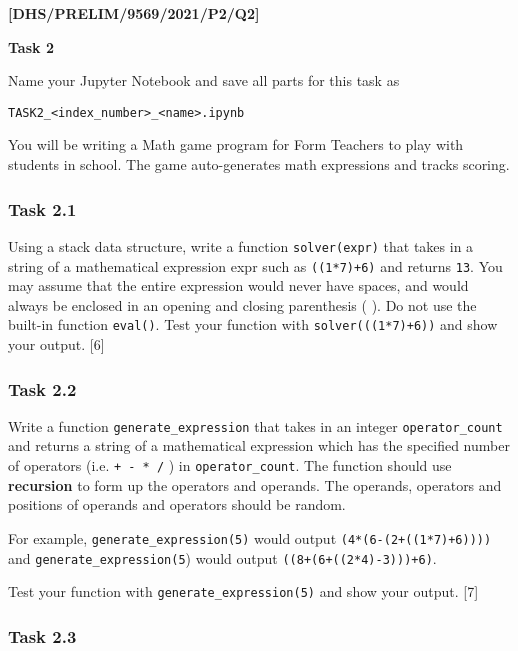 \item \textbf{{[}DHS/PRELIM/9569/2021/P2/Q2{]} }

\textbf{Task 2} 

Name your Jupyter Notebook and save all parts for this task as 

\texttt{TASK2\_<index\_number>\_<name>.ipynb }

You will be writing a Math game program for Form Teachers to play
with students in school. The game auto-generates math expressions
and tracks scoring. 

\subsubsection*{Task 2.1 }

Using a stack data structure, write a function \texttt{solver(expr)}
that takes in a string of a mathematical expression expr such as \texttt{\textquotedbl ((1{*}7)+6)\textquotedbl}
and returns \texttt{13}. You may assume that the entire expression
would never have spaces, and would always be enclosed in an opening
and closing parenthesis \textquotedbl ( )\textquotedbl . Do not
use the built-in function \texttt{eval()}. Test your function with
\texttt{solver(\textquotedbl ((1{*}7)+6)\textquotedbl )} and show
your output. \hfill{}{[}6{]}

\subsubsection*{Task 2.2 }

Write a function \texttt{generate\_expression} that takes in an integer
\texttt{operator\_count} and returns a string of a mathematical expression
which has the specified number of operators (i.e. \texttt{+ - {*}
/} ) in \texttt{operator\_count}. The function should use \textbf{recursion}
to form up the operators and operands. The operands, operators and
positions of operands and operators should be random. 

For example, \texttt{generate\_expression(5)} would output \textquotedbl\texttt{(4{*}(6-(2+((1{*}7)+6))))}\textquotedbl{}
and \texttt{generate\_expression(5}) would output \textquotedbl\texttt{((8+(6+((2{*}4)-3)))+6)}\textquotedbl . 

Test your function with \texttt{generate\_expression(5)} and show
your output. \hfill{}{[}7{]}

\subsubsection*{Task 2.3 }

